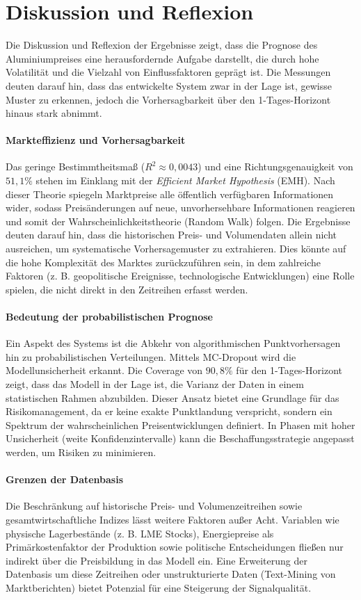 \section{Diskussion und Reflexion}
\label{sec:diskussion}

Die Diskussion und Reflexion der Ergebnisse zeigt, dass die Prognose des Aluminiumpreises eine herausfordernde Aufgabe darstellt, die durch hohe Volatilität und die Vielzahl von Einflussfaktoren geprägt ist. Die Messungen deuten darauf hin, dass das entwickelte System zwar in der Lage ist, gewisse Muster zu erkennen, jedoch die Vorhersagbarkeit über den 1-Tages-Horizont hinaus stark abnimmt.

\paragraph{Markteffizienz und Vorhersagbarkeit}
Das geringe Bestimmtheitsmaß ($R^2 \approx 0,0043$) und eine Richtungsgenauigkeit von $51,1 \%$ stehen im Einklang mit der \emph{Efficient Market Hypothesis} (EMH). Nach dieser Theorie spiegeln Marktpreise alle öffentlich verfügbaren Informationen wider, sodass Preisänderungen auf neue, unvorhersehbare Informationen reagieren und somit der Wahrscheinlichkeitstheorie (Random Walk) folgen. Die Ergebnisse deuten darauf hin, dass die historischen Preis- und Volumendaten allein nicht ausreichen, um systematische Vorhersagemuster zu extrahieren. Dies könnte auf die hohe Komplexität des Marktes zurückzuführen sein, in dem zahlreiche Faktoren (z. B. geopolitische Ereignisse, technologische Entwicklungen) eine Rolle spielen, die nicht direkt in den Zeitreihen erfasst werden.

\paragraph{Bedeutung der probabilistischen Prognose}
Ein Aspekt des Systems ist die Abkehr von algorithmischen Punktvorhersagen hin zu probabilistischen Verteilungen. Mittels MC-Dropout wird die Modellunsicherheit erkannt. Die Coverage von $90,8 \%$ für den 1-Tages-Horizont zeigt, dass das Modell in der Lage ist, die Varianz der Daten in einem statistischen Rahmen abzubilden. Dieser Ansatz bietet eine Grundlage für das Risikomanagement, da er keine exakte Punktlandung verspricht, sondern ein Spektrum der wahrscheinlichen Preisentwicklungen definiert. In Phasen mit hoher Unsicherheit (weite Konfidenzintervalle) kann die Beschaffungsstrategie  angepasst werden, um Risiken zu minimieren.

\paragraph{Grenzen der Datenbasis}
Die Beschränkung auf historische Preis- und Volumenzeitreihen sowie gesamtwirtschaftliche Indizes lässt weitere Faktoren außer Acht. Variablen wie physische Lagerbestände (z. B. LME Stocks), Energiepreise als Primärkostenfaktor der Produktion sowie politische Entscheidungen fließen nur indirekt über die Preisbildung in das Modell ein. Eine Erweiterung der Datenbasis um diese Zeitreihen oder unstrukturierte Daten (Text-Mining von Marktberichten) bietet Potenzial für eine Steigerung der Signalqualität.
